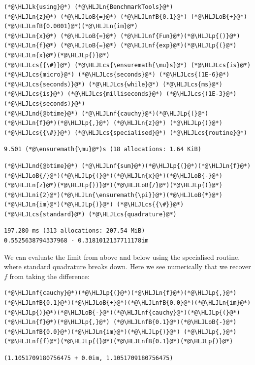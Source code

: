 \documentclass[12pt,a4paper]{article}
\newcommand{\HLJLk}[1]{\textcolor[RGB]{148,91,176}{\textbf{#1}}}
\newcommand{\HLJLn}[1]{#1}
\newcommand{\HLJLnd}[1]{\textcolor[RGB]{214,102,97}{#1}}
\newcommand{\HLJLnf}[1]{\textcolor[RGB]{66,102,213}{#1}}
\newcommand{\HLJLnfB}[1]{\textcolor[RGB]{59,151,46}{#1}}
\newcommand{\HLJLni}[1]{\textcolor[RGB]{59,151,46}{#1}}
\newcommand{\HLJLoB}[1]{\textcolor[RGB]{102,102,102}{\textbf{#1}}}
\newcommand{\HLJLp}[1]{#1}
\newcommand{\HLJLcs}[1]{\textcolor[RGB]{153,153,119}{\textit{#1}}}
\begin{document}
\begin{lstlisting}
(*@\HLJLk{using}@*) (*@\HLJLn{BenchmarkTools}@*)
(*@\HLJLn{z}@*) (*@\HLJLoB{=}@*) (*@\HLJLnfB{0.1}@*) (*@\HLJLoB{+}@*)(*@\HLJLnfB{0.0001}@*)(*@\HLJLn{im}@*)
(*@\HLJLn{x}@*) (*@\HLJLoB{=}@*) (*@\HLJLnf{Fun}@*)(*@\HLJLp{()}@*)
(*@\HLJLn{f}@*) (*@\HLJLoB{=}@*) (*@\HLJLnf{exp}@*)(*@\HLJLp{(}@*)(*@\HLJLn{x}@*)(*@\HLJLp{)}@*)
(*@\HLJLcs{{\#}}@*) (*@\HLJLcs{\ensuremath{\mu}s}@*) (*@\HLJLcs{is}@*) (*@\HLJLcs{micro}@*) (*@\HLJLcs{seconds}@*) (*@\HLJLcs{(1E-6}@*) (*@\HLJLcs{seconds)}@*) (*@\HLJLcs{while}@*) (*@\HLJLcs{ms}@*) (*@\HLJLcs{is}@*) (*@\HLJLcs{milliseconds}@*) (*@\HLJLcs{(1E-3}@*) (*@\HLJLcs{seconds)}@*) 
(*@\HLJLnd{@btime}@*) (*@\HLJLnf{cauchy}@*)(*@\HLJLp{(}@*)(*@\HLJLn{f}@*)(*@\HLJLp{,}@*) (*@\HLJLn{z}@*) (*@\HLJLp{)}@*) (*@\HLJLcs{{\#}}@*) (*@\HLJLcs{specialised}@*) (*@\HLJLcs{routine}@*)
\end{lstlisting}

\begin{lstlisting}
9.501 (*@\ensuremath{\mu}@*)s (18 allocations: 1.64 KiB)
\end{lstlisting}


\begin{lstlisting}
(*@\HLJLnd{@btime}@*) (*@\HLJLnf{sum}@*)(*@\HLJLp{(}@*)(*@\HLJLn{f}@*)(*@\HLJLoB{/}@*)(*@\HLJLp{(}@*)(*@\HLJLn{x}@*)(*@\HLJLoB{-}@*)(*@\HLJLn{z}@*)(*@\HLJLp{))}@*)(*@\HLJLoB{/}@*)(*@\HLJLp{(}@*)(*@\HLJLni{2}@*)(*@\HLJLn{\ensuremath{\pi}}@*)(*@\HLJLoB{*}@*)(*@\HLJLn{im}@*)(*@\HLJLp{)}@*) (*@\HLJLcs{{\#}}@*) (*@\HLJLcs{standard}@*) (*@\HLJLcs{quadrature}@*)
\end{lstlisting}

\begin{lstlisting}
197.280 ms (313 allocations: 207.54 MiB)
0.5525638794337968 - 0.3181012137711178im
\end{lstlisting}


We can evaluate the limit from above and below using the specialised routine,  where standard quadrature breaks down. Here we see numerically that we recover $f$ from taking the difference:


\begin{lstlisting}
(*@\HLJLnf{cauchy}@*)(*@\HLJLp{(}@*)(*@\HLJLn{f}@*)(*@\HLJLp{,}@*) (*@\HLJLnfB{0.1}@*)(*@\HLJLoB{+}@*)(*@\HLJLnfB{0.0}@*)(*@\HLJLn{im}@*)(*@\HLJLp{)}@*)(*@\HLJLoB{-}@*)(*@\HLJLnf{cauchy}@*)(*@\HLJLp{(}@*)(*@\HLJLn{f}@*)(*@\HLJLp{,}@*) (*@\HLJLnfB{0.1}@*)(*@\HLJLoB{-}@*)(*@\HLJLnfB{0.0}@*)(*@\HLJLn{im}@*)(*@\HLJLp{)}@*) (*@\HLJLp{,}@*) (*@\HLJLnf{f}@*)(*@\HLJLp{(}@*)(*@\HLJLnfB{0.1}@*)(*@\HLJLp{)}@*)
\end{lstlisting}

\begin{lstlisting}
(1.1051709180756475 + 0.0im, 1.1051709180756475)
\end{lstlisting}
\end{document}
